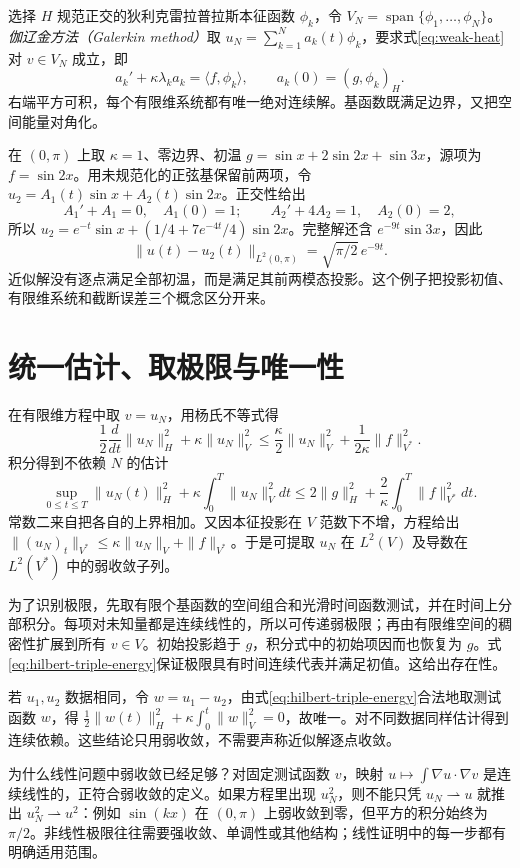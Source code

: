 选择 $H$ 规范正交的狄利克雷拉普拉斯本征函数 $\phi_k$，令 $V_N=\operatorname{span}\{\phi_1,\ldots,\phi_N\}$。\emph{伽辽金方法（Galerkin method）}取 $u_N=\sum_{k=1}^Na_k(t)\phi_k$，要求式\eqref{eq:weak-heat}对 $v\in V_N$ 成立，即
\[
 a_k'+\kappa\lambda_ka_k=\langle f,\phi_k\rangle,
 \qquad a_k(0)=(g,\phi_k)_H.
\]
右端平方可积，每个有限维系统都有唯一绝对连续解。基函数既满足边界，又把空间能量对角化。

\begin{example}[前两个模态的近似解]
在 $(0,\pi)$ 上取 $\kappa=1$、零边界、初温 $g=\sin x+2\sin2x+\sin3x$，源项为 $f=\sin2x$。用未规范化的正弦基保留前两项，令 $u_2=A_1(t)\sin x+A_2(t)\sin2x$。正交性给出
\[
 A_1'+A_1=0,\quad A_1(0)=1;\qquad
 A_2'+4A_2=1,\quad A_2(0)=2,
\]
所以 $u_2=e^{-t}\sin x+(1/4+7e^{-4t}/4)\sin2x$。完整解还含 $e^{-9t}\sin3x$，因此
\[
 \|u(t)-u_2(t)\|_{L^2(0,\pi)}=\sqrt{\pi/2}\,e^{-9t}.
\]
近似解没有逐点满足全部初温，而是满足其前两模态投影。这个例子把投影初值、有限维系统和截断误差三个概念区分开来。
\end{example}

\section{统一估计、取极限与唯一性}
在有限维方程中取 $v=u_N$，用杨氏不等式得
\[
 \frac12\frac d{dt}\|u_N\|_H^2+\kappa\|u_N\|_V^2
 \le\frac\kappa2\|u_N\|_V^2+\frac1{2\kappa}\|f\|_{V^*}^2.
\]
积分得到不依赖 $N$ 的估计
\begin{equation}
 \sup_{0\le t\le T}\|u_N(t)\|_H^2
 +\kappa\int_0^T\|u_N\|_V^2dt
 \le 2\|g\|_H^2+\frac2\kappa\int_0^T\|f\|_{V^*}^2dt.
 \label{eq:galerkin-bound}
\end{equation}
常数二来自把各自的上界相加。又因本征投影在 $V$ 范数下不增，方程给出 $\|(u_N)_t\|_{V^*}\le\kappa\|u_N\|_V+\|f\|_{V^*}$。于是可提取 $u_N$ 在 $L^2(V)$ 及导数在 $L^2(V^*)$ 中的弱收敛子列。

为了识别极限，先取有限个基函数的空间组合和光滑时间函数测试，并在时间上分部积分。每项对未知量都是连续线性的，所以可传递弱极限；再由有限维空间的稠密性扩展到所有 $v\in V$。初始投影趋于 $g$，积分式中的初始项因而也恢复为 $g$。式\eqref{eq:hilbert-triple-energy}保证极限具有时间连续代表并满足初值。这给出存在性。

若 $u_1,u_2$ 数据相同，令 $w=u_1-u_2$，由式\eqref{eq:hilbert-triple-energy}合法地取测试函数 $w$，得 $\frac12\|w(t)\|_H^2+\kappa\int_0^t\|w\|_V^2=0$，故唯一。对不同数据同样估计得到连续依赖。这些结论只用弱收敛，不需要声称近似解逐点收敛。

为什么线性问题中弱收敛已经足够？对固定测试函数 $v$，映射 $u\mapsto\int\nabla u\cdot\nabla v$ 是连续线性的，正符合弱收敛的定义。如果方程里出现 $u_N^2$，则不能只凭 $u_N\rightharpoonup u$ 就推出 $u_N^2\rightharpoonup u^2$：例如 $\sin(kx)$ 在 $(0,\pi)$ 上弱收敛到零，但平方的积分始终为 $\pi/2$。非线性极限往往需要强收敛、单调性或其他结构；线性证明中的每一步都有明确适用范围。

